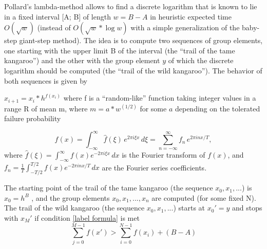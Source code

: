\documentclass[12pt]{article}
\begin{document}
Pollard’s lambda-method allows to find a discrete logarithm that is known to lie in a fixed interval [A; B] of length  $w=B-A$ in heuristic expected time $O(\sqrt{w})$ (instead of $O(\sqrt{w}*\log{w})$ with a simple generalization of the baby-step giant-step method). The idea is to compute two sequences of group elements, one starting with the upper limit B of the interval (the “trail of the tame kangaroo”) and the other with the group element $y$ of which the discrete logarithm should be computed (the “trail of the wild kangaroo”). The behavior of both sequences is given by


$x_{i+1}=x_i*h^{f(x_i)}$ where f is a “random-like” function taking integer values in a range R of mean m, where $m=a*w^{(1/2)}$ for some $a$ depending on the tolerated failure probability


$$f(x) = \int_{-\infty}^{\infty} \hat{f}(\xi)\,e^{2 \pi i \xi x} \,d\xi = \sum_{n=-\infty}^{\infty} f_n\,e^{2 \pi i n x / T},$$ where $\hat{f}(\xi) = \int_{-\infty}^{\infty} f(x) e^{-2 \pi i \xi x} \,dx$ is the Fourier transform of $f(x)$, and $f_n = \frac{1}{T} \int_{-T/2}^{T/2} f(x) e^{-2 \pi i n x / T} \,dx$ are the Fourier series coefficients.

The starting point of the trail of the tame kangaroo (the sequence $x_0,x_1,...$) is $x_0= h^B$ , and the group elements $x_0,x_1,...,x_n$ are computed (for some fixed N). The trail of the wild kangaroo (the sequence $x_0,x_1,...$) starts at $x_0'=y$  and stops with $x_M'$ if condition \ref{label formula} is met
\begin{equation}
\label{label formula}
 \sum\limits_{j=0}^{M-1} f(x') > \sum\limits_{i=0}^{N-1} f(x_i) + (B - A)   
\end{equation}
\end{document}
